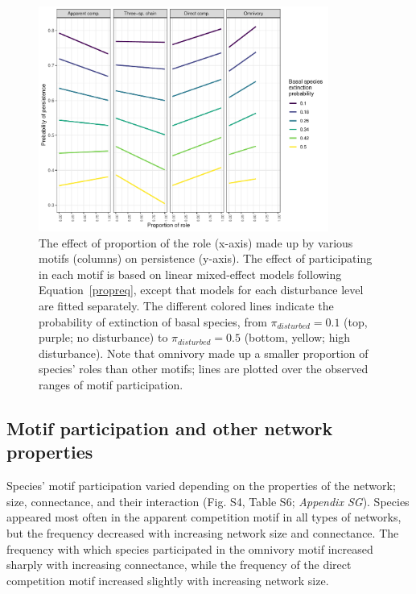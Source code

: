 \documentclass[12pt]{article}
\begin{document}
\begin{spacing}{2.0}
            
            \begin{figure}[h!]
                \centering
                \includegraphics[width=0.85\textwidth]{figures/prop_lmer_allCS.pdf}
                \caption{The effect of proportion of the role (x-axis) made up by various motifs (columns) on persistence (y-axis). The effect of participating in each motif is based on linear mixed-effect models following Equation~\ref{propreq}, except that models for each  disturbance level are fitted separately. The different colored lines indicate the probability of extinction of basal species, from $\pi_{disturbed} = 0.1$ (top, purple; no disturbance) to $\pi_{disturbed} = 0.5$ (bottom, yellow; high disturbance). Note that omnivory made up a smaller proportion of species' roles than other motifs; lines are plotted over the observed ranges of motif participation.}
                \label{fig:prop_lmer_all}
            \end{figure}
        

    \subsection*{Motif participation and other network properties}

       Species' motif participation varied depending on the properties of the network; size, connectance, and their interaction (Fig. S4, Table S6; \emph{Appendix SG}).
       Species appeared most often in the apparent competition motif in all types of networks, but the frequency decreased with increasing network size and connectance.
       The frequency with which species participated in the omnivory motif increased sharply with increasing connectance, while the frequency of the direct competition motif increased slightly with increasing network size. 
        

\end{spacing}
\end{document}
